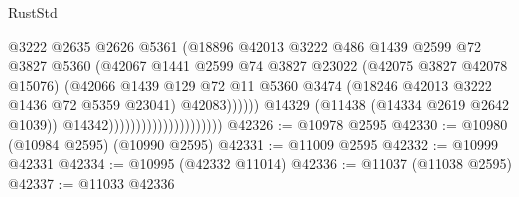 \begin{lexlean}{RustStd}
\begin{coremodule}
                                                    @3222
                                                    @2635
                                                    @2626
                                                    @5361
                                                    (@18896
                                                      @42013
                                                      @3222
                                                      @486
                                                      @1439
                                                      @2599
                                                      @72
                                                      @3827
                                                      @5360
                                                      (@42067
                                                        @1441
                                                        @2599
                                                        @74
                                                        @3827
                                                        @23022
                                                        (@42075 @3827 @42078 @15076)
                                                        (@42066
                                                          @1439
                                                          @129
                                                          @72
                                                          @11
                                                          @5360
                                                          @3474
                                                          (@18246
                                                            @42013
                                                            @3222
                                                            @1436
                                                            @72
                                                            @5359
                                                            @23041)
                                                          @42083))))))
                                              @14329
                                              (@11438 (@14334 @2619 @2642 @1039))
                                              @14342)))))))))))))))))))))
@42326 := @10978 @2595
@42330 := @10980 (@10984 @2595) (@10990 @2595)
@42331 := @11009 @2595
@42332 := @10999 @42331
@42334 := @10995 (@42332 @11014)
@42336 := @11037 (@11038 @2595)
@42337 := @11033 @42336

\end{coremodule}
\end{lexlean}
